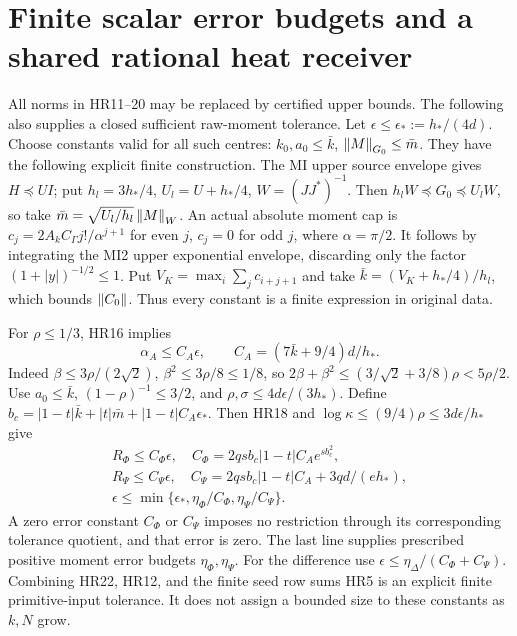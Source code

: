 \section{Finite scalar error budgets and a shared rational heat receiver}

All norms in HR11--20 may be replaced by certified upper bounds.
The following also supplies a closed sufficient raw-moment tolerance.
Let \(\epsilon\le\epsilon_*:=h_*/(4d)\). Choose constants valid for
all such centres:
\(k_0,a_0\le\bar k\), \(\left\lVert M\right\rVert_{G_0}\le\bar m\).
They have the following explicit finite construction. The MI upper
source envelope gives \(H\preceq UI\); put
\(h_l=3h_*/4\), \(U_l=U+h_*/4\), \(W=(JJ^*)^{-1}\).
Then \(h_lW\preceq G_0\preceq U_lW\), so take
\(\bar m=\sqrt{U_l/h_l}\left\lVert M\right\rVert_W\).
An actual absolute moment cap is
\(c_j=2A_kC_\Gamma j!/\alpha^{j+1}\) for even \(j\),
\(c_j=0\) for odd \(j\), where \(\alpha=\pi/2\).
It follows by integrating the MI2 upper exponential envelope,
discarding only the factor \((1+|y|)^{-1/2}\le1\).
Put \(V_K=\max_i\sum_j c_{i+j+1}\) and take
\(\bar k=(V_K+h_*/4)/h_l\), which bounds \(\left\lVert C_0\right\rVert\).
Thus every constant is a finite expression in original data.

For \(\rho\le1/3\), HR16 implies
\begin{equation}\tag{HR21}\label{hrv:HR21}
\alpha_A\le C_A\epsilon,\qquad
C_A=(7\bar k+9/4)d/h_*.
\end{equation}
Indeed \(\beta\le3\rho/(2\sqrt2)\),
\(\beta^2\le3\rho/8\le1/8\), so
\(2\beta+\beta^2\le(3/\sqrt2+3/8)\rho<5\rho/2\).
Use \(a_0\le\bar k\), \((1-\rho)^{-1}\le3/2\), and
\(\rho,\sigma\le4d\epsilon/(3h_*)\).
Define \(b_c=|1-t|\bar k+|t|\bar m+|1-t|C_A\epsilon_*\).
Then HR18 and \(\log\kappa\le(9/4)\rho\le3d\epsilon/h_*\) give
\begin{equation}\tag{HR22}\label{hrv:HR22}
\begin{gathered}
R_\Phi\le C_\Phi\epsilon,\quad
C_\Phi=2qs b_c|1-t|C_A e^{s b_c^2},\\
R_\Psi\le C_\Psi\epsilon,\quad
C_\Psi=2qs b_c|1-t|C_A+3qd/(e h_*),\\
\epsilon\le\min\{\epsilon_*,\eta_\Phi/C_\Phi,
\eta_\Psi/C_\Psi\}.
\end{gathered}
\end{equation}
A zero error constant \(C_\Phi\) or \(C_\Psi\) imposes no restriction
through its corresponding tolerance quotient, and that error is zero.
The last line supplies prescribed positive moment
error budgets \(\eta_\Phi,\eta_\Psi\). For the difference use
\(\epsilon\le\eta_\Delta/(C_\Phi+C_\Psi)\). Combining HR22, HR12,
and the finite seed row sums HR5 is an explicit finite primitive-input
tolerance. It does not assign a bounded size to these constants as
\(k,N\) grow.


